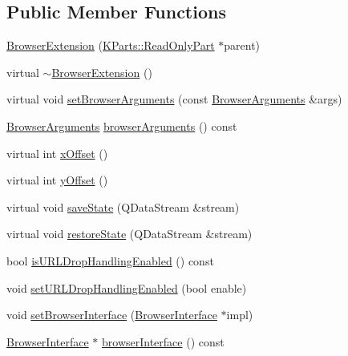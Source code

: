 \subsection*{\-Public \-Member \-Functions}
\begin{DoxyCompactItemize}
\item 
\hyperlink{classKParts_1_1BrowserExtension_acd4e7ef6cc706f7d65e82563085c1e31}{\-Browser\-Extension} (\hyperlink{classKParts_1_1ReadOnlyPart}{\-K\-Parts\-::\-Read\-Only\-Part} $\ast$parent)
\item 
virtual \hyperlink{classKParts_1_1BrowserExtension_a6a953bf6ca91db1779fdd5d52e5f5b0d}{$\sim$\-Browser\-Extension} ()
\item 
virtual void \hyperlink{classKParts_1_1BrowserExtension_a19637ad8f74585047a4477506db764bd}{set\-Browser\-Arguments} (const \hyperlink{structKParts_1_1BrowserArguments}{\-Browser\-Arguments} \&args)
\item 
\hyperlink{structKParts_1_1BrowserArguments}{\-Browser\-Arguments} \hyperlink{classKParts_1_1BrowserExtension_a8bd50c2c5bd6b43d15c4af157977cc42}{browser\-Arguments} () const 
\item 
virtual int \hyperlink{classKParts_1_1BrowserExtension_a8c8b975e3805b54a32e28c1a1b66319a}{x\-Offset} ()
\item 
virtual int \hyperlink{classKParts_1_1BrowserExtension_a205e59060b7b7d6daf1c25bf9cfdcee5}{y\-Offset} ()
\item 
virtual void \hyperlink{classKParts_1_1BrowserExtension_afe2fe963a5097ad43bea5d076485e759}{save\-State} (\-Q\-Data\-Stream \&stream)
\item 
virtual void \hyperlink{classKParts_1_1BrowserExtension_a26bba6343df8031d9aceb94cf6c6ef47}{restore\-State} (\-Q\-Data\-Stream \&stream)
\item 
bool \hyperlink{classKParts_1_1BrowserExtension_ad28ffe47eb30efa2dde7ba4b5684570e}{is\-U\-R\-L\-Drop\-Handling\-Enabled} () const 
\item 
void \hyperlink{classKParts_1_1BrowserExtension_a16e798977df4a2992e0f60a9dc01d33f}{set\-U\-R\-L\-Drop\-Handling\-Enabled} (bool enable)
\item 
void \hyperlink{classKParts_1_1BrowserExtension_a9803f929d3103b57b7d50e1bd45ea280}{set\-Browser\-Interface} (\hyperlink{classKParts_1_1BrowserInterface}{\-Browser\-Interface} $\ast$impl)
\item 
\hyperlink{classKParts_1_1BrowserInterface}{\-Browser\-Interface} $\ast$ \hyperlink{classKParts_1_1BrowserExtension_a7a4bdce73bd132afb5e9864184592fef}{browser\-Interface} () const 

\end{DoxyCompactItemize}
